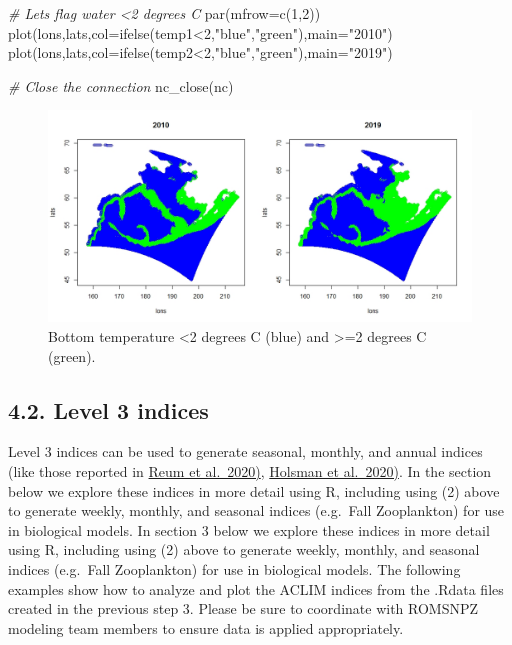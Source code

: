 \documentclass[
]{article}
\newenvironment{Shaded}{\begin{snugshade}}{\end{snugshade}}
\newcommand{\AttributeTok}[1]{\textcolor[rgb]{0.77,0.63,0.00}{#1}}
\newcommand{\CommentTok}[1]{\textcolor[rgb]{0.56,0.35,0.01}{\textit{#1}}}
\newcommand{\DecValTok}[1]{\textcolor[rgb]{0.00,0.00,0.81}{#1}}
\newcommand{\FunctionTok}[1]{\textcolor[rgb]{0.00,0.00,0.00}{#1}}
\newcommand{\NormalTok}[1]{#1}
\newcommand{\SpecialCharTok}[1]{\textcolor[rgb]{0.00,0.00,0.00}{#1}}
\newcommand{\StringTok}[1]{\textcolor[rgb]{0.31,0.60,0.02}{#1}}
\begin{document}
\begin{Shaded}
\begin{Highlighting}[]
   \CommentTok{\# Let\textquotesingle{}s flag water \textless{}2 degrees C}
   \FunctionTok{par}\NormalTok{(}\AttributeTok{mfrow=}\FunctionTok{c}\NormalTok{(}\DecValTok{1}\NormalTok{,}\DecValTok{2}\NormalTok{))}
   \FunctionTok{plot}\NormalTok{(lons,lats,}\AttributeTok{col=}\FunctionTok{ifelse}\NormalTok{(temp1}\SpecialCharTok{\textless{}}\DecValTok{2}\NormalTok{,}\StringTok{"blue"}\NormalTok{,}\StringTok{"green"}\NormalTok{),}\AttributeTok{main=}\StringTok{"2010"}\NormalTok{)}
   \FunctionTok{plot}\NormalTok{(lons,lats,}\AttributeTok{col=}\FunctionTok{ifelse}\NormalTok{(temp2}\SpecialCharTok{\textless{}}\DecValTok{2}\NormalTok{,}\StringTok{"blue"}\NormalTok{,}\StringTok{"green"}\NormalTok{),}\AttributeTok{main=}\StringTok{"2019"}\NormalTok{)}

   \CommentTok{\# Close the connection}
   \FunctionTok{nc\_close}\NormalTok{(nc)}
\end{Highlighting}
\end{Shaded}

\begin{figure}
\centering
\includegraphics[width=1\textwidth,height=\textheight]{Figs/minimal_coldpool.jpg}
\caption{Bottom temperature \textless2 degrees C (blue) and
\textgreater=2 degrees C (green).}
\end{figure}

\hypertarget{level-3-indices}{%
\subsection{4.2. Level 3 indices}\label{level-3-indices}}

Level 3 indices can be used to generate seasonal, monthly, and annual
indices (like those reported in
\href{https://www.frontiersin.org/articles/10.3389/fmars.2020.00124/full}{Reum
et al.~2020)},
\href{http://dx.doi.org/10.1038/s41467-020-18300-3}{Holsman et
al.~2020)}. In the section below we explore these indices in more detail
using R, including using (2) above to generate weekly, monthly, and
seasonal indices (e.g.~Fall Zooplankton) for use in biological models.
In section 3 below we explore these indices in more detail using R,
including using (2) above to generate weekly, monthly, and seasonal
indices (e.g.~Fall Zooplankton) for use in biological models. The
following examples show how to analyze and plot the ACLIM indices from
the .Rdata files created in the previous step 3. Please be sure to
coordinate with ROMSNPZ modeling team members to ensure data is applied
appropriately.
\end{document}
